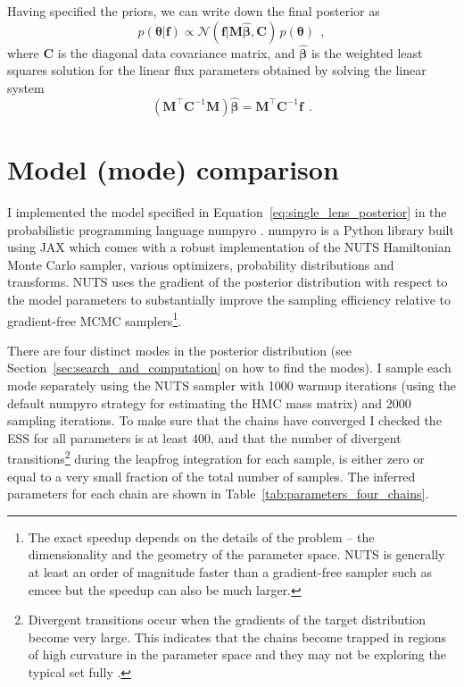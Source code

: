 \documentclass[12pt,dvipsnames]{report}
\newcommand{\ssf}[1]{\textsf{#1}}
\renewcommand{\vec}[1]{\boldsymbol{\mathbf{#1}}}
\newcommand{\hquad}{~~}
\begin{document}
Having specified the priors, we can write down the final posterior as 
\begin{equation}
    p(\vec\theta|\vec f)\propto \mathcal{N}(\vec f|\vec M\hat{\vec \beta},\vec C)\,p(\vec\theta)
    \hquad,
    \label{eq:single_lens_posterior}
\end{equation}
where $\vec C$ is the diagonal data covariance matrix, and $\hat{\vec\beta}$ is the weighted 
least squares solution for the linear flux parameters obtained by solving the linear system 
\begin{equation}
(\vec M^\intercal \vec C^{-1} \vec M)\hat{\vec\beta} = \vec M^\intercal \vec C^{-1} \vec f
\hquad .
\end{equation}


\section{Model (mode) comparison}
\label{sec:model_comparison_single_lens}
I implemented the model specified in Equation~\ref{eq:single_lens_posterior} 
in the probabilistic programming language \ssf{numpyro} \citep{arXiv:1912.11554}. 
\ssf{numpyro} is a \ssf{Python} library built using \ssf{JAX} which comes with a 
robust implementation of the NUTS Hamiltonian Monte Carlo sampler, various 
optimizers, probability distributions and transforms.
NUTS uses the gradient of the posterior distribution with respect to the 
model parameters to substantially improve the sampling efficiency relative to 
gradient-free MCMC samplers\footnote{The exact speedup
depends on the details of the problem  -- the dimensionality and the geometry of the 
parameter space. NUTS is generally at least an order of magnitude faster than a 
gradient-free sampler such as \ssf{emcee} \citep{2013PASP..125..306F} but the speedup
can also be much larger.}.

There are four distinct modes in the posterior distribution (see 
Section~\ref{sec:search_and_computation} on how to find the modes). 
I sample each mode separately using the NUTS sampler with 1000 warmup iterations 
(using the default \ssf{numpyro} strategy for estimating the HMC mass matrix) 
and 2000 sampling iterations. To make sure that the chains have converged I checked the 
ESS for all parameters 
is at least 400, and that the number of divergent transitions\footnote{Divergent 
transitions occur when the gradients of the target distribution become very large.
This indicates that the chains become trapped in regions of high curvature 
in the parameter space and they may not be exploring the typical set fully 
\citep{arXiv:1701.02434}.} during the leapfrog integration for each sample, is either 
zero or equal to a very small fraction of the total number of samples. 
The inferred parameters for each chain are shown in 
Table~\ref{tab:parameters_four_chains}.
\end{document}
